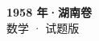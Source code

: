 \documentclass[zihao=-4, a4paper]{ctexart}
\begin{document}
\begin{center}
  {\Large\bfseries 1958 年·湖南卷}\\[4pt]
  {\large 数学 · 试题版}
\end{center}
\medskip
{}

\end{document}
